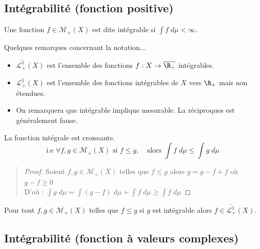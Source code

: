 \subsection{Intégrabilité (fonction positive)}

\begin{definition}
    Une fonction $f \in \overline{\mathcal{M}_+}(X)$ est dite intégrable si $\int f \;d \mu < \infty $.
\end{definition}

\begin{remark}
    Quelques remarques concernant la notation... 
    \begin{itemize}
        \item $\overline{\mathcal{L}_+^1}(X)$ est l'ensemble des fonctions $f : X \rightarrow \overline{\R_+}$ intégrables.
        \item ${\mathcal{L}_+^1}(X)$ est l'ensemble des fonctions intégrables de $X$ vers $\R_+$ mais non étendues.
        \item On remarquera que intégrable implique mesurable. La réciproques est généralement fause.
    \end{itemize}
\end{remark}

\begin{prop}
    La fonction intégrale est croissante.
    \[ \text{i.e } \forall f,g \in \overline{\mathcal{M}_+}(X) \text{ si } f \leq g, \quad \text{alors } \int f \; d \mu \leq \int g \; d \mu \] 
\end{prop}

\begin{quote}
    \footnotesize 
    \begin{proof}
        Soient $f, g \in \overline{\mathcal{M}_+}(X)$ telles que $f \leq g$ alors $g = g-f+f$ où $g-f \geq 0 $ \\
        D'où : $ \int g \; d \mu = \int (g-f) \; d \mu + \int f \; d \mu \geq \int f \; d \mu $
    \end{proof}
    \normalsize
\end{quote}

\begin{remark}
    Pour tout $f,g \in \overline{\mathcal{M}_+}(X)$ telles que $f \leq g$ si $g$ est intégrable alors $f \in \overline{\mathcal{L}_+^1}(X)$.
\end{remark}

\subsection{Intégrabilité (fonction à valeurs complexes)}

